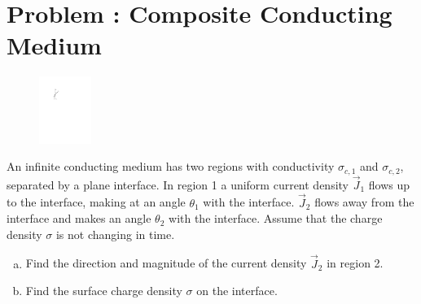 \documentclass[problems]{esg8022pset}
\begin{document}
\section{Problem \thesection: Composite Conducting Medium}
  \begin{figure}\vspace{-5\intextsep}
    \begin{center}\includegraphics[width=0.15\textwidth]{ps06_07_01}\end{center}
  \end{figure}
  An infinite conducting medium has two regions with conductivity $\sigma_{c,1}$ and $\sigma_{c,2}$, separated by a plane interface. In
  region 1 a uniform current density $\vec J_1$ flows up to the interface, making at an angle $\theta_1$ with the interface. $\vec J_2$ flows away from the interface and makes an angle $\theta_2$ with the interface. Assume that the charge density $\sigma$ is not changing in time.
  \begin{enumerate}[(a)]
    \item Find the direction and magnitude of the current density $\vec J_2$ in region 2.
    \item Find the surface charge density $\sigma$ on the interface.
  \end{enumerate}
\end{document}
